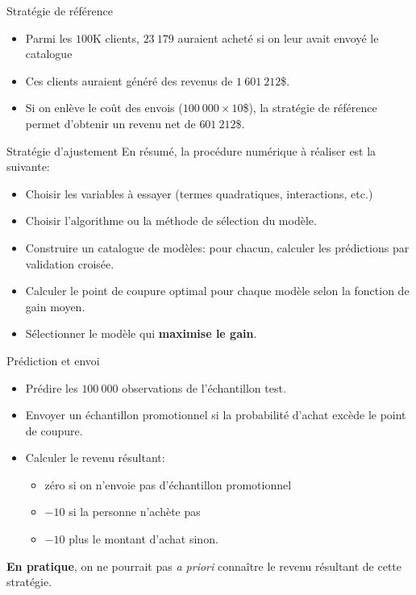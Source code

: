 \documentclass[
  ignorenonframetext,
]{beamer}
\providecommand{\tightlist}{%
  \setlength{\itemsep}{0pt}\setlength{\parskip}{0pt}}\usepackage{longtable,booktabs,array}
\begin{document}
\begin{frame}{Stratégie de référence}
\label{stratuxe9gie-de-ruxe9fuxe9rence}
\begin{itemize}
\tightlist
\item
  Parmi les \(100\)K clients, \(23~179\) auraient acheté si on leur
  avait envoyé le catalogue
\item
  Ces clients auraient généré des revenus de \(1~601~212\)\$.
\item
  Si on enlève le coût des envois (\(100~000 \times 10\)\$), la
  stratégie de référence permet d'obtenir un revenu net de
  \(601~212\)\$.
\end{itemize}
\end{frame}

\begin{frame}{Stratégie d'ajustement}
\label{stratuxe9gie-dajustement}
En résumé, la procédure numérique à réaliser est la suivante:

\begin{itemize}
\tightlist
\item
  Choisir les variables à essayer (termes quadratiques, interactions,
  etc.)
\item
  Choisir l'algorithme ou la méthode de sélection du modèle.
\item
  Construire un catalogue de modèles: pour chacun, calculer les
  prédictions par validation croisée.
\item
  Calculer le point de coupure optimal pour chaque modèle selon la
  fonction de gain moyen.
\item
  Sélectionner le modèle qui \textbf{maximise le gain}.
\end{itemize}
\end{frame}

\begin{frame}{Prédiction et envoi}
\label{pruxe9diction-et-envoi}
\begin{itemize}
\tightlist
\item
  Prédire les \(100~000\) observations de l'échantillon test.
\item
  Envoyer un échantillon promotionnel si la probabilité d'achat excède
  le point de coupure.
\item
  Calculer le revenu résultant:

  \begin{itemize}
  \tightlist
  \item
    zéro si on n'envoie pas d'échantillon promotionnel
  \item
    \(-10\) si la personne n'achète pas
  \item
    \(-10\) plus le montant d'achat sinon.
  \end{itemize}
\end{itemize}

\textbf{En pratique}, on ne pourrait pas \emph{a priori} connaître le
revenu résultant de cette stratégie.
\end{frame}
\end{document}
